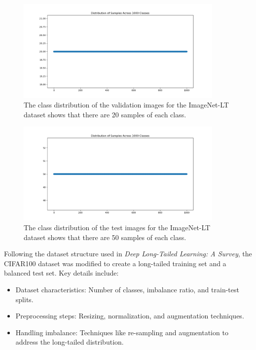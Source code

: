 \begin{figure}[h!]
    \centering
    \includegraphics[width=0.9\textwidth]{Images/Plots/class_distribution_val.png}
    \caption{The class distribution of the validation images for the ImageNet-LT dataset shows that there are 20 samples of each class.}
    \label{fig:IN-val}
\end{figure}

\begin{figure}[h!]
    \centering
    \includegraphics[width=0.9\textwidth]{Images/Plots/class_distribution_test.png}
    \caption{The class distribution of the test images for the ImageNet-LT dataset shows that there are 50 samples of each class.}
    \label{fig:IN-test}
\end{figure}

Following the dataset structure used in \textit{Deep Long-Tailed Learning: A Survey}, the CIFAR100 dataset was modified to create a long-tailed training set and a balanced test set. Key details include:

\begin{itemize}
    \item Dataset characteristics: Number of classes, imbalance ratio, and train-test splits.
    \item Preprocessing steps: Resizing, normalization, and augmentation techniques.
    \item Handling imbalance: Techniques like re-sampling and augmentation to address the long-tailed distribution.
\end{itemize}

